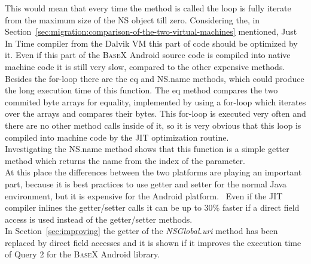 This would mean that every time the method is called the loop is fully iterate from the maximum size of the \textsf{NS} object till zero.
Considering the, in Section~\ref{sec:migration:comparison-of-the-two-virtual-machines} mentioned, Just In Time compiler from the Dalvik VM this part of code should be optimized by it.
Even if this part of the \textsc{BaseX} Android source code is compiled into native machine code it is still very slow, compared to the other expensive methods.
Besides the for-loop there are the \textsf{eq} and \textsf{NS.name} methods, which could produce the long execution time of this function.
The \textsf{eq} method compares the two commited byte arrays for equality, implemented by using a for-loop which iterates over the arrays and compares their bytes.
This for-loop is executed very often and there are no other method calls inside of it, so it is very obvious that this loop is compiled into machine code by the JIT optimization routine.\\
Investigating the \textsf{NS.name} method shows that this function is a simple getter method which returns the name from the index of the parameter.\\
At this place the differences between the two platforms are playing an important part, because it is best practices to use getter and setter for the normal Java environment, but it is expensive for the Android platform.~\cite{toninievlautatingandroid}
Even if the JIT compiler inlines the getter/setter calls it can be up to 30\% faster if a direct field access is used instead of the getter/setter methods.~\cite{toninianalysis}\\
In Section~\ref{sec:improving} the getter of the \textit{NSGlobal.uri} method has been replaced by direct field accesses and it is shown if it improves the execution time of Query 2 for the \textsc{BaseX} Android library.



